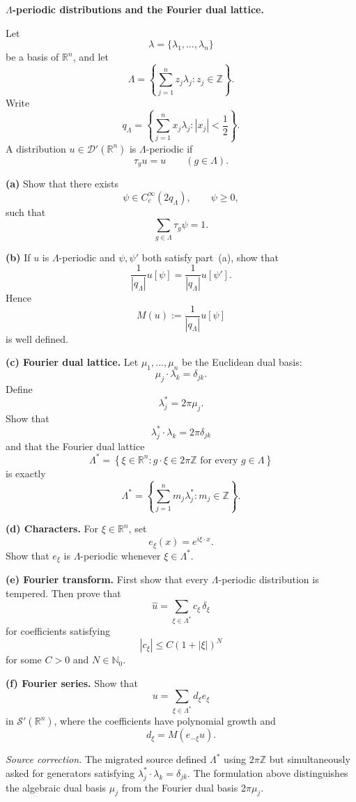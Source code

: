 \begin{problem}[CP-III-0023]
\label{prob:cp-iii-0023}
\textbf{\(\Lambda\)-periodic distributions and the Fourier dual lattice.}

Let
\[
\lambda=\{\lambda_1,\dots,\lambda_n\}
\]
be a basis of \(\mathbb R^n\), and let
\[
\Lambda
=
\left\{
\sum_{j=1}^n z_j\lambda_j:
z_j\in\mathbb Z
\right\}.
\]
Write
\[
q_\Lambda
=
\left\{
\sum_{j=1}^n x_j\lambda_j:
|x_j|<\frac12
\right\}.
\]
A distribution \(u\in\mathcal D'(\mathbb R^n)\) is
\(\Lambda\)-periodic if
\[
\tau_g u=u
\qquad(g\in\Lambda).
\]

\par\smallskip\noindent\textbf{(a)}
Show that there exists
\[
\psi\in C_c^\infty(2q_\Lambda),
\qquad
\psi\ge0,
\]
such that
\[
\sum_{g\in\Lambda}\tau_g\psi=1.
\]

\par\smallskip\noindent\textbf{(b)}
If \(u\) is \(\Lambda\)-periodic and \(\psi,\psi'\) both satisfy part~(a),
show that
\[
\frac1{|q_\Lambda|}u[\psi]
=
\frac1{|q_\Lambda|}u[\psi'].
\]
Hence
\[
M(u)
:=
\frac1{|q_\Lambda|}u[\psi]
\]
is well defined.

\par\smallskip\noindent\textbf{(c) Fourier dual lattice.}
Let \(\mu_1,\dots,\mu_n\) be the Euclidean dual basis:
\[
\mu_j\cdot\lambda_k=\delta_{jk}.
\]
Define
\[
\lambda_j^*
=
2\pi\mu_j.
\]
Show that
\[
\lambda_j^*\cdot\lambda_k
=
2\pi\delta_{jk}
\]
and that the Fourier dual lattice
\[
\Lambda^*
=
\left\{
\xi\in\mathbb R^n:
g\cdot\xi\in2\pi\mathbb Z
\text{ for every }g\in\Lambda
\right\}
\]
is exactly
\[
\Lambda^*
=
\left\{
\sum_{j=1}^n m_j\lambda_j^*:
m_j\in\mathbb Z
\right\}.
\]

\par\smallskip\noindent\textbf{(d) Characters.}
For \(\xi\in\mathbb R^n\), set
\[
e_\xi(x)=e^{i\xi\cdot x}.
\]
Show that \(e_\xi\) is \(\Lambda\)-periodic whenever
\(\xi\in\Lambda^*\).

\par\smallskip\noindent\textbf{(e) Fourier transform.}
First show that every \(\Lambda\)-periodic distribution is tempered.
Then prove that
\[
\widehat u
=
\sum_{\xi\in\Lambda^*}
c_\xi\,\delta_\xi
\]
for coefficients satisfying
\[
|c_\xi|
\le
C(1+|\xi|)^N
\]
for some \(C>0\) and \(N\in\mathbb N_0\).

\par\smallskip\noindent\textbf{(f) Fourier series.}
Show that
\[
u
=
\sum_{\xi\in\Lambda^*}
d_\xi e_\xi
\]
in \(\mathcal S'(\mathbb R^n)\), where the coefficients have polynomial
growth and
\[
d_\xi
=
M(e_{-\xi}u).
\]

\medskip
\noindent
\textit{Source correction.}
The migrated source defined \(\Lambda^*\) using
\(2\pi\mathbb Z\) but simultaneously asked for generators satisfying
\(\lambda_j^*\cdot\lambda_k=\delta_{jk}\). The formulation above
distinguishes the algebraic dual basis \(\mu_j\) from the Fourier dual
basis \(2\pi\mu_j\).
\end{problem}

